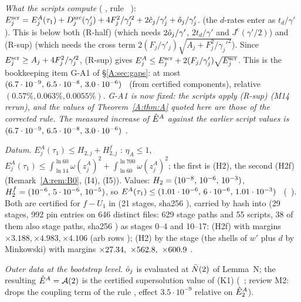 \documentclass[11pt]{article}
\begin{document}
\noindent\emph{What the scripts compute} ( , rule \SA\ ): $E^{\rm scr}_j=E^A_j(\tau_1)+D^{\rm src}_j(\gamma'_j)+4F_j^2/\gamma_j'^2+2\hat c_j/\gamma'_j+\hat o_j/\gamma'_j$. (the $d$-rates enter as $t_d/\gamma'$). This is below both (R-half) (which needs $2\hat o_j/\gamma'$, $2t_d/\gamma'$ and $J^e(\gamma'/2)$) and (R-sup) (which needs the cross term $2(F_j/\gamma'_j)\sqrt{A_j+F_j^2/\gamma_j'^2}$). Since $E^{\rm scr}_j\ge A_j+4F_j^2/\gamma_j'^2$, (R-sup) gives $E^A_j\le E^{\rm scr}_j+2(F_j/\gamma'_j)\sqrt{E^{\rm scr}_j}$. This is the bookkeeping item G-A1 of \S\ref{A:sec:gaps}: at most $(6.7\cdot10^{-9},\,6.5\cdot10^{-8},\,3.0\cdot10^{-6})$ \tE\ (from certified components), relative $(0.57\%,0.063\%,0.0055\%)$. \emph{G-A1 is now fixed: the scripts apply (R-sup) (M14 rerun), and the values of Theorem~\ref{A:thm:A} quoted here are those of the corrected rule. The measured increase of $\hat E^A$ against the earlier script values is $(6.7\cdot10^{-9},\,6.5\cdot10^{-8},\,3.0\cdot10^{-6})$ \tE.}

\emph{Datum.} $E^A_j(\tau_1)\le H_{2,j}+H^f_{2,j}$ \tP: $\eta_A\le1$, $E^A_j(\tau_1)\le\int_{\ln14}^{\ln60}\omega(z^A_j)^2+\int_{\ln60}^{\ln700}\omega(z^A_j)^2$; the first is (H2), the second (H2f) (Remark~\ref{A:rem:B0}, (I4), (I5)). Values: $H_2=(10^{-8},\,10^{-6},\,10^{-3})$, $H^f_2=(10^{-6},\,5\cdot10^{-6},\,10^{-5})$, so $E^A(\tau_1)\le(1.01\cdot10^{-6},\,6\cdot10^{-6},\,1.01\cdot10^{-3})$ \tH\ (\SA\ ). Both are certified for $f-U_1$ in  (21 stages, sha256 ), carried by hash into  (29 stages, 992 pin entries on 646 distinct files: 629 stage paths and 55 scripts, 38 of them also stage paths, sha256 ) as stages 0--4 and 10--17: (H2f) with margins $\times3.188,\times4.983,\times4.106$ (arb rows ); (H2) by the stage  (the shells of $w'$ plus $d$ by Minkowski) with margins $\times27.34,\ \times562.8,\ \times600.9$ \tC\tB.

\emph{Outer data at the bootstrap level.} $\hat o_j$ is evaluated at $\bar N(2)$ of Lemma~N; the resulting $\hat E^A=\mathcal A(2)$ is the certified supersolution value of  (K1) (\SU\ ; review M2:  drops the coupling term of the rule , effect $3.5\cdot10^{-9}$ relative on $\hat E^A_2$).
\end{document}
